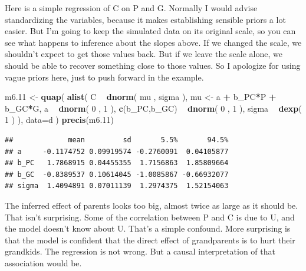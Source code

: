 \documentclass[
]{article}
\newenvironment{Shaded}{\begin{snugshade}}{\end{snugshade}}
\newcommand{\DataTypeTok}[1]{\textcolor[rgb]{0.13,0.29,0.53}{#1}}
\newcommand{\DecValTok}[1]{\textcolor[rgb]{0.00,0.00,0.81}{#1}}
\newcommand{\FloatTok}[1]{\textcolor[rgb]{0.00,0.00,0.81}{#1}}
\newcommand{\KeywordTok}[1]{\textcolor[rgb]{0.13,0.29,0.53}{\textbf{#1}}}
\newcommand{\NormalTok}[1]{#1}
\newcommand{\OperatorTok}[1]{\textcolor[rgb]{0.81,0.36,0.00}{\textbf{#1}}}
\newcommand{\StringTok}[1]{\textcolor[rgb]{0.31,0.60,0.02}{#1}}
\begin{document}
Here is a simple regression of C on P and G. Normally I would advise
standardizing the variables, because it makes establishing sensible
priors a lot easier. But I'm going to keep the simulated data on its
original scale, so you can see what happens to inference about the
slopes above. If we changed the scale, we shouldn't expect to get those
values back. But if we leave the scale alone, we should be able to
recover something close to those values. So I apologize for using vague
priors here, just to push forward in the example.

\begin{Shaded}
\begin{Highlighting}[]
\NormalTok{m6}\FloatTok{.11}\NormalTok{ <-}\StringTok{ }\KeywordTok{quap}\NormalTok{( }\KeywordTok{alist}\NormalTok{(}
\NormalTok{C }\OperatorTok{~}\StringTok{ }\KeywordTok{dnorm}\NormalTok{( mu , sigma ),}
\NormalTok{mu <-}\StringTok{ }\NormalTok{a }\OperatorTok{+}\StringTok{ }\NormalTok{b_PC}\OperatorTok{*}\NormalTok{P }\OperatorTok{+}\StringTok{ }\NormalTok{b_GC}\OperatorTok{*}\NormalTok{G,}
\NormalTok{a }\OperatorTok{~}\StringTok{ }\KeywordTok{dnorm}\NormalTok{( }\DecValTok{0}\NormalTok{ , }\DecValTok{1}\NormalTok{ ), }
\KeywordTok{c}\NormalTok{(b_PC,b_GC) }\OperatorTok{~}\StringTok{ }\KeywordTok{dnorm}\NormalTok{( }\DecValTok{0}\NormalTok{ , }\DecValTok{1}\NormalTok{ ), }
\NormalTok{sigma }\OperatorTok{~}\StringTok{ }\KeywordTok{dexp}\NormalTok{( }\DecValTok{1}\NormalTok{ )}
\NormalTok{), }\DataTypeTok{data=}\NormalTok{d ) }
\KeywordTok{precis}\NormalTok{(m6}\FloatTok{.11}\NormalTok{)}
\end{Highlighting}
\end{Shaded}

\begin{verbatim}
##             mean         sd       5.5%       94.5%
## a     -0.1174752 0.09919574 -0.2760091  0.04105877
## b_PC   1.7868915 0.04455355  1.7156863  1.85809664
## b_GC  -0.8389537 0.10614045 -1.0085867 -0.66932077
## sigma  1.4094891 0.07011139  1.2974375  1.52154063
\end{verbatim}

The inferred effect of parents looks too big, almost twice as large as
it should be. That isn't surprising. Some of the correlation between P
and C is due to U, and the model doesn't know about U. That's a simple
confound. More surprising is that the model is confident that the direct
effect of grandparents is to hurt their grandkids. The regression is not
wrong. But a causal interpretation of that association would be.
\end{document}
